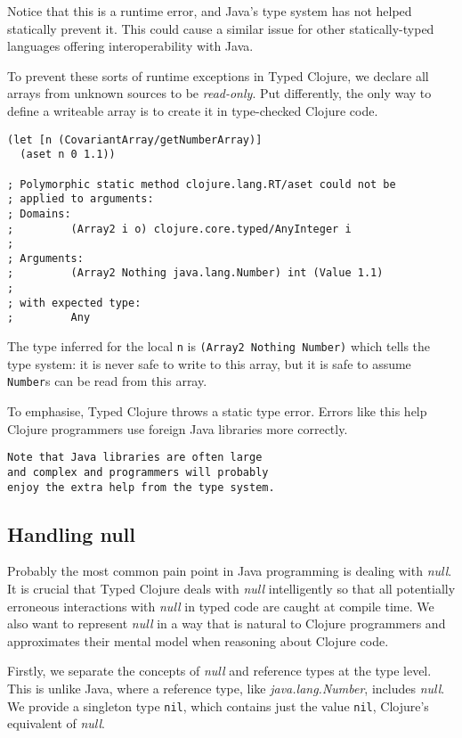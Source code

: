 \documentclass[preprint,10pt]{sigplanconf}
\begin{document}
Notice that this is a runtime error, and Java's type system has not helped
statically prevent it.
This could cause a similar issue for other statically-typed languages offering
interoperability with Java. 

To prevent these sorts of runtime exceptions in Typed Clojure, we declare
all arrays from unknown sources to be \emph{read-only}. Put differently,
the only way to define a writeable array is to create it in type-checked Clojure
code.

\begin{lstlisting}
(let [n (CovariantArray/getNumberArray)]
  (aset n 0 1.1))

; Polymorphic static method clojure.lang.RT/aset could not be 
; applied to arguments:
; Domains: 
;         (Array2 i o) clojure.core.typed/AnyInteger i
; 
; Arguments:
;         (Array2 Nothing java.lang.Number) int (Value 1.1)
; 
; with expected type:
;         Any
\end{lstlisting}

The type inferred for the local \lstinline|n| is \lstinline|(Array2 Nothing Number)|
which tells the type system: it is never safe to write to this array, but
it is safe to assume \lstinline|Number|s can be read from this array.

To emphasise, Typed Clojure throws a static type error. Errors like this help Clojure programmers
use foreign Java libraries more correctly.

\begin{verbatim}
Note that Java libraries are often large 
and complex and programmers will probably
enjoy the extra help from the type system.
\end{verbatim}

\subsection{Handling null}
\label{sec:null}

Probably the most common pain point in Java programming is dealing with \emph{null}.
It is crucial that Typed Clojure deals with \emph{null} intelligently so that
all potentially erroneous interactions with \emph{null} in typed code are caught at compile time.
We also want to represent \emph{null} in a way that is natural to Clojure programmers
and approximates their mental model when reasoning about Clojure code.

Firstly, we separate the concepts of \emph{null} and reference types at the type level.
This is unlike Java, where a reference type, like \emph{java.lang.Number}, includes \emph{null}.
We provide a singleton type \lstinline|nil|, which contains just the value \lstinline|nil|,
Clojure's equivalent of \emph{null}. 
\end{document}
